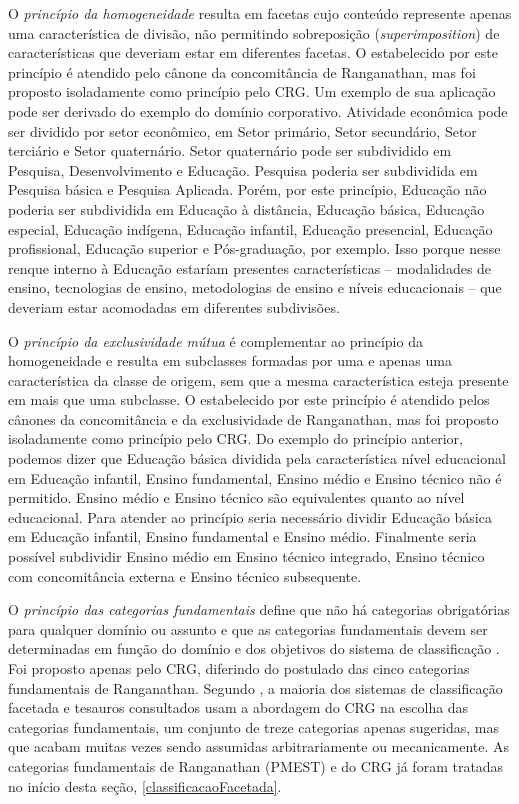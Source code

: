 O \emph{princípio da homogeneidade} resulta em facetas cujo conteúdo represente apenas uma característica de divisão, não permitindo sobreposição (\textit{superimposition}) de características que deveriam estar em diferentes facetas. O estabelecido por este princípio é atendido pelo cânone da concomitância de Ranganathan, mas foi proposto isoladamente como princípio pelo CRG. Um exemplo de sua aplicação pode ser derivado do exemplo do domínio corporativo. Atividade econômica pode ser dividido por setor econômico, em Setor primário, Setor secundário, Setor terciário e Setor quaternário. Setor quaternário pode ser subdividido em Pesquisa, Desenvolvimento e Educação. Pesquisa poderia ser subdividida em Pesquisa básica e Pesquisa Aplicada. Porém, por este princípio, Educação não poderia ser subdividida em Educação à distância, Educação básica, Educação especial, Educação indígena, Educação infantil, Educação presencial, Educação profissional, Educação superior e Pós-graduação, por exemplo. Isso porque nesse renque interno à Educação estaríam presentes características -- modalidades de ensino, tecnologias de ensino, metodologias de ensino e níveis educacionais -- que deveriam estar acomodadas em diferentes subdivisões.

O \emph{princípio da exclusividade mútua} é complementar ao princípio da homogeneidade e resulta em subclasses formadas por uma e apenas uma característica da classe de origem, sem que a mesma característica esteja presente em mais que uma subclasse. O estabelecido por este princípio é atendido pelos cânones da concomitância e da exclusividade de Ranganathan, mas foi proposto isoladamente como princípio pelo CRG. Do exemplo do princípio anterior, podemos dizer que Educação básica dividida pela característica nível educacional em Educação infantil, Ensino fundamental, Ensino médio e Ensino técnico não é permitido. Ensino médio e Ensino técnico são equivalentes quanto ao nível educacional. Para atender ao princípio seria necessário dividir Educação básica em Educação infantil, Ensino fundamental e Ensino médio. Finalmente seria possível subdividir Ensino médio em Ensino técnico integrado, Ensino técnico com concomitância externa e Ensino técnico subsequente.

O \emph{princípio das categorias fundamentais} define que não há categorias obrigatórias para qualquer domínio ou assunto e que as categorias fundamentais devem ser determinadas em função do domínio e dos objetivos do sistema de classificação \cite{spiteri98simplified}. Foi proposto apenas pelo CRG, diferindo do postulado das cinco categorias fundamentais de Ranganathan. Segundo , a maioria dos sistemas de classificação facetada e tesauros consultados usam a abordagem do CRG na escolha das categorias fundamentais, um conjunto de treze categorias apenas sugeridas, mas que acabam muitas vezes sendo assumidas arbitrariamente ou mecanicamente. As categorias fundamentais de Ranganathan (PMEST) e do CRG já foram tratadas no início desta seção, \ref{classificacaoFacetada}.

